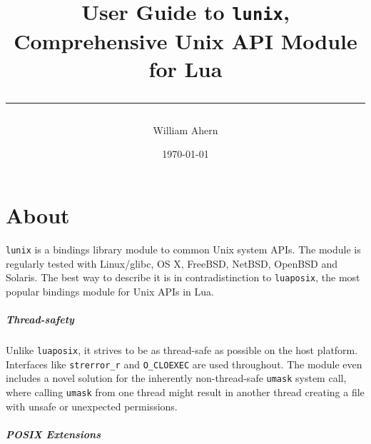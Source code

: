 \documentclass[11pt, oneside]{memoir}
\newcommand*{\lunix}[0]{\texttt{lunix}\xspace}
\newcommand*{\luaposix}[0]{\texttt{luaposix}\xspace}
\newcommand*{\fn}[1]{\texttt{#1}\xspace}
\newcommand*{\const}[1]{\texttt{#1}\xspace}
\begin{document}

\title{

\vspace*{10ex}

\HUGE\sffamily User Guide to \lunix, \\


\HUGE Comprehensive Unix API Module for Lua \\

\vspace*{30pt}
\hrule
}

\date{\today}
\author{William Ahern}
\maketitle
\thispagestyle{empty}
\clearpage

\setcounter{page}{1}
\tableofcontents

\clearpage

\setcounter{page}{1}

\setlength{\beforechapskip}{1ex}
\setlength{\afterchapskip}{1ex}

\chapter{About}

\lunix is a bindings library module to common Unix system APIs. The module is regularly tested with Linux/glibc, OS X, FreeBSD, NetBSD, OpenBSD and Solaris. The best way to describe it is in contradistinction to \luaposix, the most popular bindings module for Unix APIs in Lua.

\paragraph{Thread-safety}

Unlike \luaposix, it strives to be as thread-safe as possible on the host platform. Interfaces like \fn{strerror\_r} and \const{O\_CLOEXEC} are used throughout. The module even includes a novel solution for the inherently non-thread-safe \fn{umask} system call, where calling \fn{umask} from one thread might result in another thread creating a file with unsafe or unexpected permissions.

\paragraph{POSIX Extensions}
\end{document}
